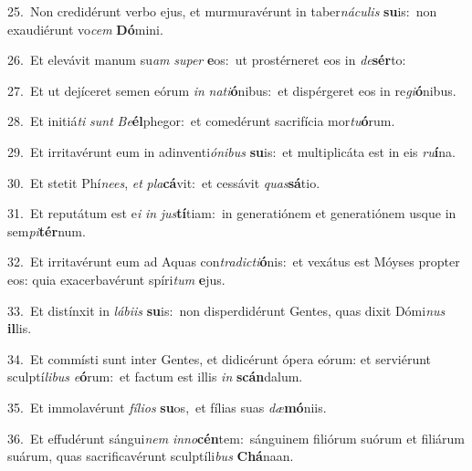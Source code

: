 {\numbfont\textcolor{\numbcolor}{25.}}~Non credidérunt verbo ejus, et murmuravérunt in taber\-\textit{ná}\-\textit{cu}\textit{lis} \textbf{su}\-is:~\star non exaudiérunt vo\textit{cem} \textbf{Dó}\-mini.\par
{\numbfont\textcolor{\numbcolor}{26.}}~Et elevávit manum su\textit{am} \textit{su}\-\textit{per} \textbf{e}\-os:~\star ut prostérneret eos in \textit{de}\-\textbf{sér}to:\par
{\numbfont\textcolor{\numbcolor}{27.}}~Et ut dejíceret semen eórum \textit{in} \textit{na}\-\textit{ti}\textbf{ó}nibus:~\star et dispérgeret eos in re\-\textit{gi}\-\textbf{ó}nibus.\par
{\numbfont\textcolor{\numbcolor}{28.}}~Et initiá\textit{ti} \textit{sunt} \textit{Be}\-\textbf{él}phegor:~\star et comedérunt sacrifícia mor\-\textit{tu}\-\textbf{ó}rum.\par
{\numbfont\textcolor{\numbcolor}{29.}}~Et irritavérunt eum in adinventi\-\textit{ó}\-\textit{ni}\textit{bus} \textbf{su}\-is:~\star et multiplicáta est in eis \textit{ru}\-\textbf{í}na.\par
{\numbfont\textcolor{\numbcolor}{30.}}~Et stetit Phí\-\textit{nees}\-, \textit{et} \textit{pla}\-\textbf{cá}vit:~\star et cessávit \textit{quas}\-\textbf{sá}tio.\par
{\numbfont\textcolor{\numbcolor}{31.}}~Et reputátum est e\textit{i} \textit{in} \textit{jus}\-\textbf{tí}tiam:~\star in generatiónem et generatiónem usque in sem\-\textit{pi}\-\textbf{tér}num.\par
{\numbfont\textcolor{\numbcolor}{32.}}~Et irritavérunt eum ad Aquas con\-\textit{tra}\-\textit{dic}\textit{ti}\textbf{ó}nis:~\star et vexátus est Móyses propter eos: quia exacerbavérunt spíri\textit{tum} \textbf{e}\-jus.\par
{\numbfont\textcolor{\numbcolor}{33.}}~Et distínxit in \textit{lá}\-\textit{bi}\textit{is} \textbf{su}\-is:~\star non disperdidérunt Gentes, quas dixit Dómi\textit{nus} \textbf{il}\-lis.\par
{\numbfont\textcolor{\numbcolor}{34.}}~Et commísti sunt inter Gentes, et didicérunt ópera eórum: et serviérunt sculptí\-\textit{li}\-\textit{bus} \textit{e}\-\textbf{ó}rum:~\star et factum est illis \textit{in} \textbf{scán}\-dalum.\par
{\numbfont\textcolor{\numbcolor}{35.}}~Et immolavérunt \textit{fí}\-\textit{li}\textit{os} \textbf{su}\-os,~\star et fílias suas \textit{dæ}\-\textbf{mó}niis.\par
{\numbfont\textcolor{\numbcolor}{36.}}~Et effudérunt sángui\textit{nem} \textit{in}\-\textit{no}\textbf{cén}tem:~\star sánguinem filiórum suórum et filiárum suárum, quas sacrificavérunt sculptíli\textit{bus} \textbf{Chá}\-naan.\par
